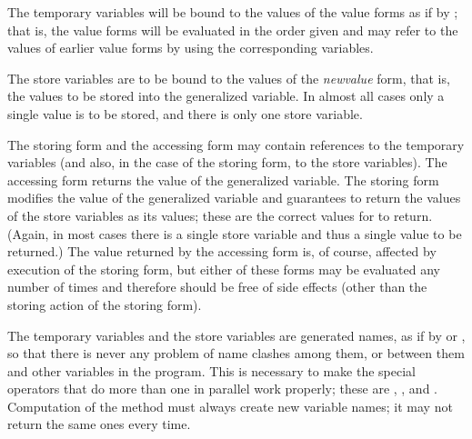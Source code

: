 The temporary variables will be bound to the values of
the value forms as if by ; that is, the
value forms will be evaluated in the order given
and may refer to the values of earlier value forms
by using the corresponding variables.

The store variables are to be bound to the values of the \emph{newvalue} form,
that is, the values to be
stored into the generalized variable.  In almost all cases only a
single value is to be stored, and there is only one store variable.

The storing form and the accessing form may contain references to
the temporary variables (and also, in the case of the storing form,
to the store variables).  The accessing form returns the value of the
generalized variable.  The storing form modifies the value of the
generalized variable and guarantees to return the values of the
store variables as
its values; these are the correct values for  to
return.  (Again, in most cases there is a single store variable
and thus a single value to be returned.)
The value returned by the accessing form is, of course,
affected by execution of the storing form, but either of these
forms may be evaluated any number of times and therefore should be
free of side effects (other than the storing action of the storing form).

The temporary variables and the store variables are generated names,
as if by  or ,
so that there is never any problem of name clashes among them, or
between them and other variables in the program.  This is necessary to
make the special operators that do more than one  in parallel work
properly; these are , , and .  Computation
of the  method must always create new variable names; it may not return
the same ones every time.

